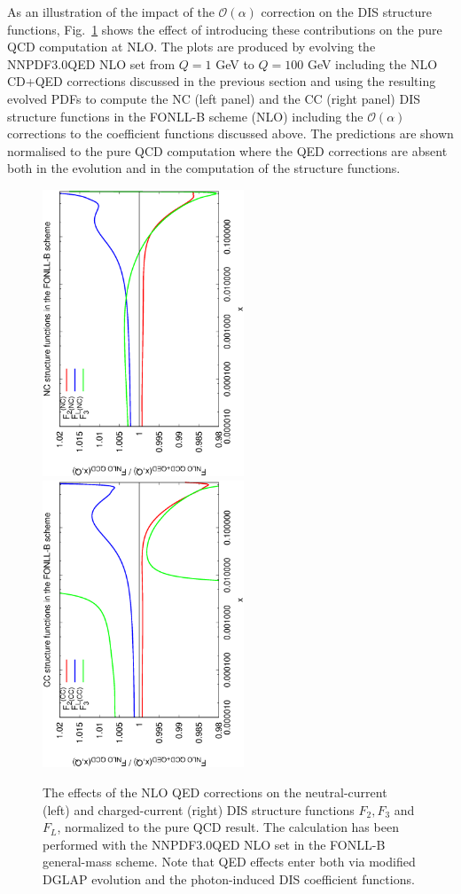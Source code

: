 As an illustration of the impact of the $\mathcal{O}(\alpha)$
correction on the DIS structure functions, Fig.~\ref{fig:StructFuncs}
shows the effect of introducing these contributions on the pure QCD
computation at NLO. The plots are produced by evolving the
NNPDF3.0QED NLO set
from $Q=1$
GeV to $Q=100$ GeV including the NLO CD+QED corrections discussed in the
previous section and using the resulting evolved PDFs to compute the
NC (left panel) and the CC (right panel) DIS structure functions in
the FONLL-B scheme (NLO) including the $\mathcal{O}(\alpha)$
corrections to the coefficient functions discussed above.
%
The
predictions are shown normalised to the pure QCD computation where the
QED corrections are absent both in the evolution and in the
computation of the structure functions.

\begin{figure}[t]
\includegraphics[width=6cm,angle=270]{figs/NLOQEDCorrections_NC.eps}
\includegraphics[width=6cm,angle=270]{figs/NLOQEDCorrections_CC.eps}
\caption{The effects of the NLO QED corrections on the neutral-current
(left) and charged-current (right) DIS structure functions
$F_2, F_3$ and $F_L$, normalized to the pure QCD result.
%
The calculation has been performed with the NNPDF3.0QED NLO
set in the FONLL-B general-mass scheme.
%
Note that QED effects enter both via modified DGLAP evolution and the
photon-induced DIS coefficient functions.}
\label{fig:StructFuncs}
\end{figure}

